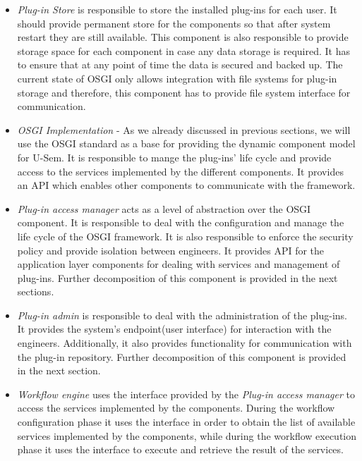 \begin{itemize}

\item \textit{Plug-in Store} is responsible to store the installed plug-ins for each user. It should provide permanent store for the components so that after system restart they are still available. This component is also responsible to provide storage space for each component in case any data storage is required. It has to ensure that at any point of time the data is secured and backed up. The current state of OSGI only allows integration with file systems for plug-in storage and therefore, this component has to provide file system interface for communication.

\item \textit{OSGI Implementation} - As we already discussed in previous sections, we will use the OSGI standard as a base for providing the dynamic component model for U-Sem. It is responsible to mange the plug-ins' life cycle and provide access to the services implemented by the different components. It provides an API which enables other components to communicate with the framework.

\item \textit{Plug-in access manager} acts as a level of abstraction over the OSGI component. It is responsible to deal with the configuration and manage the life cycle of the OSGI framework. It is also responsible to enforce the security policy and provide isolation between engineers. It provides API for the application layer components for dealing with services and management of plug-ins. Further decomposition of this component is provided in the next sections.

\item \textit{Plug-in admin} is responsible to deal with the administration of the plug-ins. It provides the system's endpoint(user interface) for interaction with the engineers. Additionally, it also provides functionality for communication with the plug-in repository. Further decomposition of this component is provided in the next section. 

\item \textit{Workflow engine} uses the interface provided by the \textit{Plug-in access manager} to access the services implemented by the components. During the workflow configuration phase it uses the interface in order to obtain the list of available services implemented by the components, while during the workflow execution phase it uses the interface to execute and retrieve the result of the services.
	
\end{itemize}


